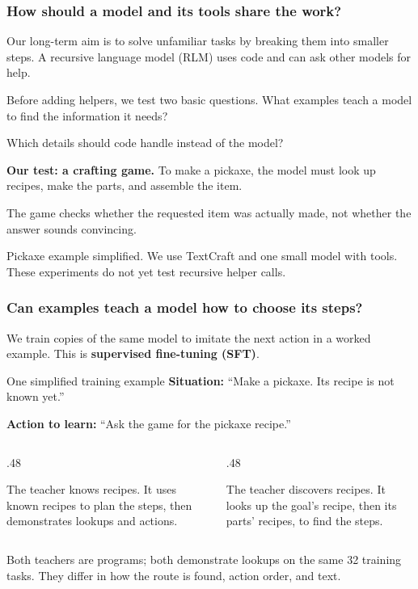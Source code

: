 \documentclass[aspectratio=169,12pt]{beamer}
\newcommand{\aside}[1]{\vfill{\footnotesize\color{Gray}#1\par}}
\begin{document}
\begin{frame}[t]
\frametitle{How should a model and its tools share the work?}
Our long-term aim is to solve unfamiliar tasks by breaking them into smaller steps. A recursive language model (RLM) uses code and can ask other models for help.
\begin{block}{Before adding helpers, we test two basic questions.}
What examples teach a model to find the information it needs?\par
Which details should code handle instead of the model?
\end{block}
\textbf{Our test: a crafting game.} To make a pickaxe, the model must look up recipes, make the parts, and assemble the item.
\medskip

The game checks whether the requested item was actually made, not whether the answer sounds convincing.
\aside{Pickaxe example simplified. We use TextCraft and one small model with tools. These experiments do not yet test recursive helper calls.}
\end{frame}

\begin{frame}[t]
\frametitle{Can examples teach a model how to choose its steps?}
We train copies of the same model to imitate the next action in a worked example. This is \textbf{supervised fine-tuning (SFT)}.
\begin{block}{One simplified training example}
\textbf{Situation:} ``Make a pickaxe. Its recipe is not known yet.''\par
\textbf{Action to learn:} ``Ask the game for the pickaxe recipe.''
\end{block}
\begin{columns}[T,onlytextwidth]
\begin{column}{.48\textwidth}
\begin{block}{The teacher knows recipes.}
It uses known recipes to plan the steps, then demonstrates lookups and actions.
\end{block}
\end{column}
\begin{column}{.48\textwidth}
\begin{block}{The teacher discovers recipes.}
It looks up the goal's recipe, then its parts' recipes, to find the steps.
\end{block}
\end{column}
\end{columns}
\aside{Both teachers are programs; both demonstrate lookups on the same 32 training tasks. They differ in how the route is found, action order, and text.}
\end{frame}
\end{document}
